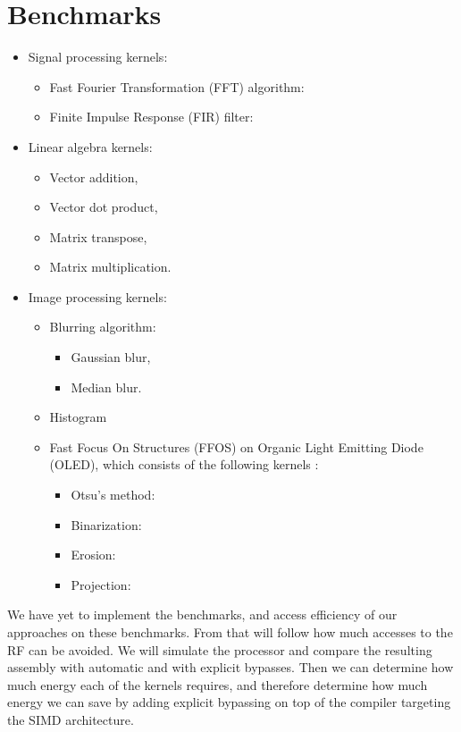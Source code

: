 \section{Benchmarks}\label{sec:benchmarks}
\begin{itemize}
    \item Signal processing kernels:
        \begin{itemize}
            \item Fast Fourier Transformation (FFT) algorithm:
            \item Finite Impulse Response (FIR) filter:
        \end{itemize}
    \item Linear algebra kernels:
        \begin{itemize}
            \item Vector addition,
            \item Vector dot product,
            \item Matrix transpose,
            \item Matrix multiplication.
        \end{itemize}
        \item Image processing kernels:
    \begin{itemize}
        \item Blurring algorithm:
        \begin{itemize}
            \item Gaussian blur,
            \item Median blur.
        \end{itemize}
        \item Histogram
        \item Fast Focus On Structures (FFOS) on  Organic Light Emitting Diode (OLED), which consists of the following kernels \cite{ffos}:
        \begin{itemize}
            \item Otsu's method: 
            \item Binarization: 
            \item Erosion: 
            \item Projection: 
        \end{itemize}
    \end{itemize}
    
\end{itemize}

We have yet to implement the benchmarks, and access efficiency of our approaches on these benchmarks. From that will follow how much accesses to the RF can be avoided. We will simulate the processor and compare the resulting assembly with automatic and with explicit bypasses. Then we can determine how much energy each of the kernels requires, and therefore determine how much energy we can save by adding explicit bypassing on top of the compiler targeting the SIMD architecture. 